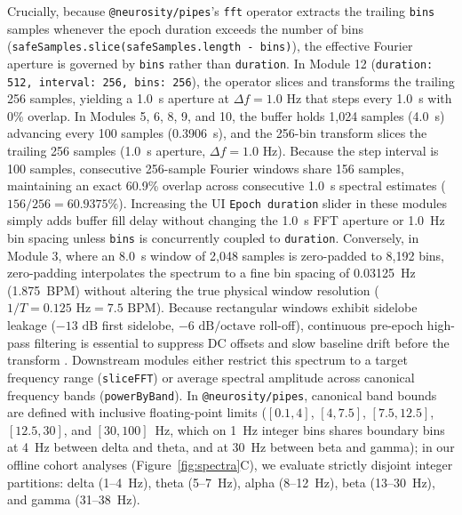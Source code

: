 \documentclass[11pt,letterpaper]{article}
\begin{document}
Crucially, because \texttt{@neurosity/pipes}'s \texttt{fft} operator extracts the trailing \texttt{bins} samples whenever the epoch duration exceeds the number of bins (\texttt{safeSamples.slice(safeSamples.length - bins)}), the effective Fourier aperture is governed by \texttt{bins} rather than \texttt{duration}. In Module 12 (\texttt{duration: 512, interval: 256, bins: 256}), the operator slices and transforms the trailing 256 samples, yielding a 1.0~s aperture at $\Delta f = 1.0\text{ Hz}$ that steps every 1.0~s with 0\% overlap. In Modules 5, 6, 8, 9, and 10, the buffer holds 1,024 samples (4.0~s) advancing every 100 samples (0.3906~s), and the 256-bin transform slices the trailing 256 samples (1.0~s aperture, $\Delta f = 1.0\text{ Hz}$). Because the step interval is 100 samples, consecutive 256-sample Fourier windows share 156 samples, maintaining an exact 60.9\% overlap across consecutive 1.0~s spectral estimates ($156/256 = 60.9375\%$). Increasing the UI \texttt{Epoch duration} slider in these modules simply adds buffer fill delay without changing the 1.0~s FFT aperture or 1.0~Hz bin spacing unless \texttt{bins} is concurrently coupled to \texttt{duration}. Conversely, in Module 3, where an 8.0~s window of 2,048 samples is zero-padded to 8,192 bins, zero-padding interpolates the spectrum to a fine bin spacing of 0.03125~Hz (1.875~BPM) without altering the true physical window resolution ($1/T = 0.125\text{ Hz} = 7.5\text{ BPM}$). Because rectangular windows exhibit sidelobe leakage ($-13\text{ dB}$ first sidelobe, $-6\text{ dB/octave}$ roll-off), continuous pre-epoch high-pass filtering is essential to suppress DC offsets and slow baseline drift before the transform \citep{keil2022recommendations}. Downstream modules either restrict this spectrum to a target frequency range (\texttt{sliceFFT}) or average spectral amplitude across canonical frequency bands (\texttt{powerByBand}). In \texttt{@neurosity/pipes}, canonical band bounds are defined with inclusive floating-point limits ($[0.1, 4]$, $[4, 7.5]$, $[7.5, 12.5]$, $[12.5, 30]$, and $[30, 100]$~Hz, which on 1~Hz integer bins shares boundary bins at 4~Hz between delta and theta, and at 30~Hz between beta and gamma); in our offline cohort analyses (Figure~\ref{fig:spectra}C), we evaluate strictly disjoint integer partitions: delta (1--4~Hz), theta (5--7~Hz), alpha (8--12~Hz), beta (13--30~Hz), and gamma (31--38~Hz).
\end{document}

